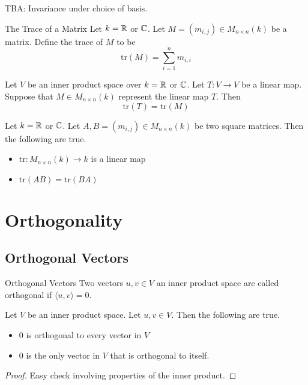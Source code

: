 \documentclass[a4paper]{article}
\begin{document}
TBA: Invariance under choice of basis. 

\begin{defn}{The Trace of a Matrix}{} Let $k=\mathbb{R}$ or $\mathbb{C}$. Let $M=(m_{i,j})\in M_{n\times n}(k)$ be a matrix. Define the trace of $M$ to be $$\text{tr}(M)=\sum_{i=1}^nm_{i,i}$$
\end{defn}

\begin{prp}{}{} Let $V$ be an inner product space over $k=\mathbb{R}$ or $\mathbb{C}$. Let $T:V\to V$ be a linear map. Suppose that $M\in M_{n\times n}(k)$ represent the linear map $T$. Then $$\text{tr}(T)=\text{tr}(M)$$
\end{prp}

\begin{lmm}{}{} Let $k=\mathbb{R}$ or $\mathbb{C}$. Let $A,B=(m_{i,j})\in M_{n\times n}(k)$ be two square matrices. Then the following are true. 
\begin{itemize}
\item $\text{tr}:M_{n\times n}(k)\to k$ is a linear map
\item $\text{tr}(AB)=\text{tr}(BA)$
\end{itemize}
\end{lmm}

\pagebreak
\section{Orthogonality}
\subsection{Orthogonal Vectors}
\begin{defn}{Orthogonal Vectors}{} Two vectors $u,v\in V$ an inner product space are called orthogonal if $\langle u,v\rangle=0$. 
\end{defn}

\begin{crl}{}{} Let $V$ be an inner product space. Let $u,v\in V$. Then the following are true. 
\begin{itemize}
\item $0$ is orthogonal to every vector in $V$
\item $0$ is the only vector in $V$ that is orthogonal to itself. 
\end{itemize} \tcbline
\begin{proof}
Easy check involving properties of the inner product. 
\end{proof}
\end{crl}
\end{document}

